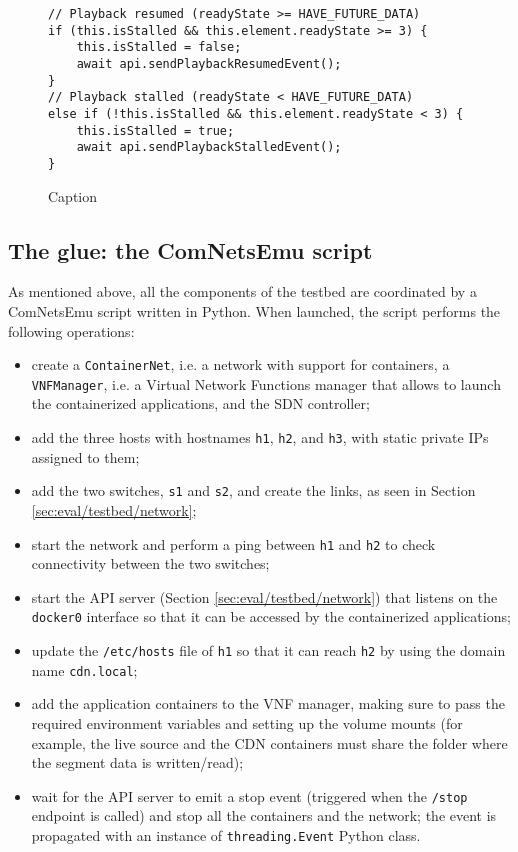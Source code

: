\begin{figure}
    \centering
    \begin{verbatim}
// Playback resumed (readyState >= HAVE_FUTURE_DATA)
if (this.isStalled && this.element.readyState >= 3) {
    this.isStalled = false;
    await api.sendPlaybackResumedEvent();
}
// Playback stalled (readyState < HAVE_FUTURE_DATA)
else if (!this.isStalled && this.element.readyState < 3) {
    this.isStalled = true;
    await api.sendPlaybackStalledEvent();
}
    \end{verbatim}
    \caption{Caption}
    \label{fig:hls_readystate}
\end{figure}

\subsection{The glue: the ComNetsEmu script}
\label{sec:eval/testbed/script}

As mentioned above, all the components of the testbed are coordinated by a ComNetsEmu script written in Python. When launched, the script performs the following operations:

\begin{itemize}
    \item create a \texttt{ContainerNet}, i.e. a network with support for containers, a \texttt{VNFManager}, i.e. a Virtual Network Functions manager that allows to launch the containerized applications, and the SDN controller;
    \item add the three hosts with hostnames \texttt{h1}, \texttt{h2}, and \texttt{h3}, with static private IPs assigned to them;
    \item add the two switches, \texttt{s1} and \texttt{s2}, and create the links, as seen in Section \ref{sec:eval/testbed/network};
    \item start the network and perform a ping between \texttt{h1} and \texttt{h2} to check connectivity between the two switches;
    \item start the API server (Section \ref{sec:eval/testbed/network}) that listens on the \texttt{docker0} interface so that it can be accessed by the containerized applications;
    \item update the \texttt{/etc/hosts} file of \texttt{h1} so that it can reach \texttt{h2} by using the domain name \texttt{cdn.local};
    \item add the application containers to the VNF manager, making sure to pass the required environment variables and setting up the volume mounts (for example, the live source and the CDN containers must share the folder where the segment data is written/read);
    \item wait for the API server to emit a stop event (triggered when the \texttt{/stop} endpoint is called) and stop all the containers and the network; the event is propagated with an instance of \texttt{threading.Event} Python class.
\end{itemize}


